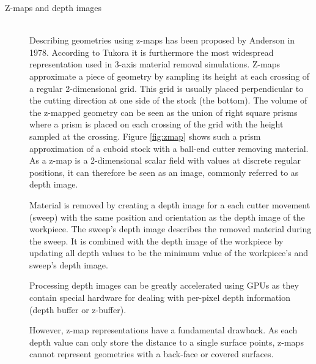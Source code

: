 \begin{description}
	\item[Z-maps and depth images] \hfill \\
	Describing geometries using z-maps has been proposed by Anderson \cite{zmap} in 1978.
	According to Tukora it is furthermore the most widespread representation used in 3-axis material removal simulations.
	Z-maps approximate a piece of geometry by sampling its height at each crossing of a regular 2-dimensional grid.
	This grid is usually placed perpendicular to the cutting direction at one side of the stock (\eg the bottom).
	The volume of the z-mapped geometry can be seen as the union of right square prisms where a prism is placed on each crossing of the grid with the height sampled at the crossing.
	Figure \ref{fig:zmap} shows such a prism approximation of a cuboid stock with a ball-end cutter removing material.
	As a z-map is a 2-dimensional scalar field with values at discrete regular positions, it can therefore be seen as an image, commonly referred to as depth image.
	
	Material is removed by creating a depth image for a each cutter movement (\aka sweep) with the same position and orientation as the depth image of the workpiece.
	The sweep's depth image describes the removed material during the sweep.
	It is combined with the depth image of the workpiece by updating all depth values to be the minimum value of the workpiece's and sweep's depth image.

	Processing depth images can be greatly accelerated using GPUs as they contain special hardware for dealing with per-pixel depth information (\ie depth buffer or z-buffer).
	
	However, z-map representations have a fundamental drawback.
	As each depth value can only store the distance to a single surface points, z-maps cannot represent geometries with a back-face or covered surfaces.
	

\end{description}
